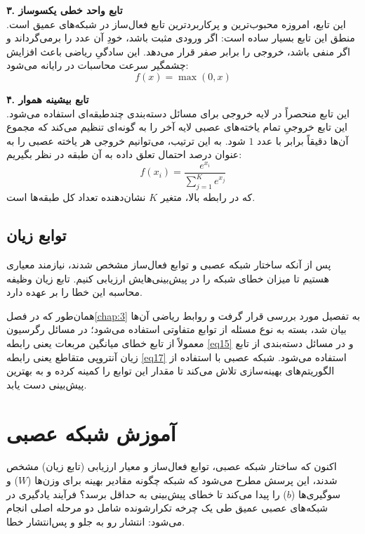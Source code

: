 \textbf{۳. تابع واحد خطی یکسوساز} \\
این تابع، امروزه محبوب‌ترین و پرکاربردترین تابع فعال‌ساز در شبکه‌های عمیق است. منطق این تابع بسیار ساده است: اگر ورودی مثبت باشد، خودِ آن عدد را برمی‌گرداند و اگر منفی باشد، خروجی را برابر صفر قرار می‌دهد. این سادگیِ ریاضی باعث افزایش چشمگیر سرعت محاسبات در رایانه می‌شود:
\begin{equation} \label{eq21}
	f(x) = \max(0, x)
\end{equation}

\textbf{۴. تابع بیشینه هموار} \\
این تابع منحصراً در لایه خروجی برای مسائل دسته‌بندی چندطبقه‌ای استفاده می‌شود. این تابع خروجیِ تمام یاخته‌های عصبی لایه آخر را به گونه‌ای تنظیم می‌کند که مجموع آن‌ها دقیقاً برابر با عدد $1$ شود. به این ترتیب، می‌توانیم خروجی هر یاخته عصبی را به عنوان درصد احتمال تعلق داده به آن طبقه در نظر بگیریم:
\begin{equation} \label{eq22}
	f(x_i) = \frac{e^{x_i}}{\sum_{j=1}^{K} e^{x_j}}
\end{equation}
که در رابطه بالا، متغیر $K$ نشان‌دهنده تعداد کل طبقه‌ها است.

\subsection{توابع زیان}\label{subsec:4-3-3}
پس از آنکه ساختار شبکه عصبی و توابع فعال‌ساز مشخص شدند، نیازمند معیاری هستیم تا میزان خطای شبکه را در پیش‌بینی‌هایش ارزیابی کنیم. تابع زیان وظیفه محاسبه این خطا را بر عهده دارد. 

همان‌طور که در فصل\ref{chap:3} به تفصیل مورد بررسی قرار گرفت و روابط ریاضی آن‌ها بیان شد، بسته به نوع مسئله از توابع متفاوتی استفاده می‌شود؛ در مسائل رگرسیون معمولاً از تابع خطای میانگین مربعات یعنی رابطه \eqref{eq15} و در مسائل دسته‌بندی از تابع زیان آنتروپی متقاطع یعنی رابطه \eqref{eq17} استفاده می‌شود. شبکه عصبی با استفاده از الگوریتم‌های بهینه‌سازی تلاش می‌کند تا مقدار این توابع را کمینه کرده و به بهترین پیش‌بینی دست یابد.
\section{آموزش شبکه عصبی}\label{sec:4-4}
اکنون که ساختار شبکه عصبی، توابع فعال‌ساز و معیار ارزیابی (تابع زیان) مشخص شدند، این پرسش مطرح می‌شود که شبکه چگونه مقادیر بهینه برای وزن‌ها ($W$) و سوگیری‌ها ($b$) را پیدا می‌کند تا خطای پیش‌بینی به حداقل برسد؟ فرآیند یادگیری در شبکه‌های عصبی عمیق طی یک چرخه تکرارشونده شامل دو مرحله اصلی انجام می‌شود: انتشار رو به جلو و پس‌انتشار خطا.

